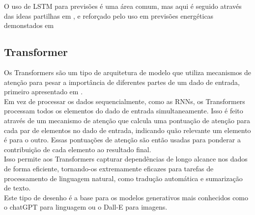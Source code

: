 O uso de \gls{LSTM} para previsões é uma área comum, mas aqui é seguido através das ideas partilhas em \cite{Hewamalage2021}, e reforçado pelo uso em previsões energéticas demonstados em \cite{Costa2022} \\


\subsection{Transformer\label{se:transformer_sec}}

Os Transformers são um tipo de arquitetura de modelo que utiliza mecanismos de atenção para pesar a importância de diferentes partes de um dado de entrada, primeiro apresentado em \cite{Vaswani2017}.\\
Em vez de processar os dados sequencialmente, como as RNNs, os Transformers processam todos os elementos do dado de entrada simultaneamente. Isso é feito através de um mecanismo de atenção que calcula uma pontuação de atenção para cada par de elementos no dado de entrada, indicando quão relevante um elemento é para o outro. Essas pontuações de atenção são então usadas para ponderar a contribuição de cada elemento ao resultado final. \\
Isso permite aos Transformers capturar dependências de longo alcance nos dados de forma eficiente, tornando-os extremamente eficazes para tarefas de processamento de linguagem natural, como tradução automática e sumarização de texto.\\
Este tipo de desenho é a base para os modelos generativos mais conhecidos como o chatGPT para linguagem ou o Dall-E para imagens.\\



